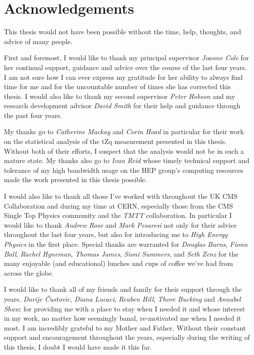 \documentclass[11pt,a4paper]{report}
\begin{document}
\clearpage
\newpage

\chapter*{Acknowledgements} \label{sec:acknowledgments}
This thesis would not have been possible without the time, help, thoughts, and advice of many people.

First and foremost, I would like to thank my principal supervisor \textit{Joanne Cole} for her continual support, guidance and advice over the course of the last four years.
I am not sure how I can ever express my gratitude for her ability to always find time for me and for the uncountable number of times she has corrected this thesis.
I would also like to thank my second supervisor \emph{Peter Hobson} and my research development advisor \emph{David Smith} for their help and guidance through the past four years.

My thanks go to \textit{Catherine Mackay} and \textit{Corin Hoad} in particular for their work on the statistical analysis of the tZq measurement presented in this thesis.
Without both of their efforts, I suspect that the analysis would not be in such a mature state.
My thanks also go to \textit{Ivan Reid} whose timely technical support and tolerance of my high bandwidth usage on the HEP group's computing resources made the work presented in this thesis possible.

I would also like to thank all those I've worked with throughout the UK CMS Collaboration and during my time at CERN, especially those from the CMS Single Top Physics community and the \emph{TMTT} collaboration.
In particular I would like to thank \textit{Andrew Rose} and \textit{Mark Pesaresi} not only for their advice throughout the last four years, but also for introducing me to \emph{High Energy Physics} in the first place.
Special thanks are warranted for \textit{Douglas Burns}, \textit{Fionn Ball}, \textit{Rachel Hyneman}, \textit{Thomas James}, \textit{Sioni Summers}, and \textit{Seth Zenz} for the many enjoyable (and educational) lunches and cups of coffee we've had from across the globe.

I would like to thank all of my friends and family for their support through the years.
\textit{Darije \v{C}ustovi{c}}, \textit{Diana Lucaci}, \textit{Reuben Hill}, \textit{Thore Bucking} and \textit{Annabel Shaw}; for providing me with a place to stay when I needed it and whose interest in my work, no matter how seemingly banal, re-motivated me when I needed it most.
I am incredibly grateful to my Mother and Father.
Without their constant support and encouragement throughout the years, especially during the writing of this thesis, I doubt I would have made it this far.
\end{document}
